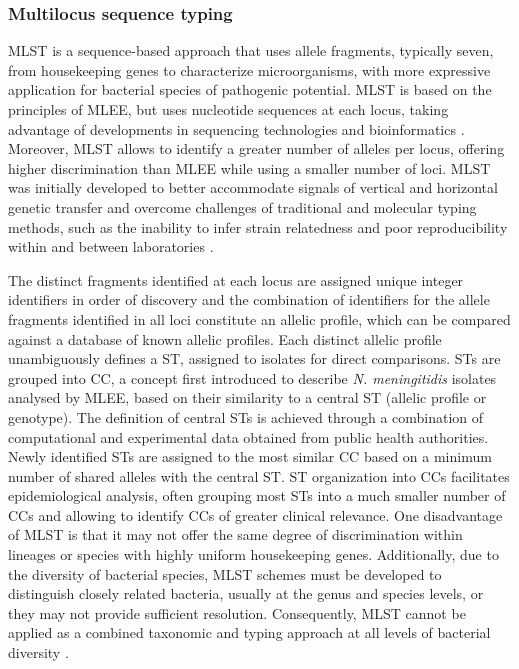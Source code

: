 \subsubsection{Multilocus sequence typing}

\ac{MLST} is a sequence-based approach that uses allele fragments, typically seven, from housekeeping genes to characterize microorganisms, with more expressive application for bacterial species of pathogenic potential. \ac{MLST} is based on the principles of \ac{MLEE}, but uses nucleotide sequences at each locus, taking advantage of developments in sequencing technologies and bioinformatics \cite{urwin_multi-locus_2003}. Moreover, \ac{MLST} allows to identify a greater number of alleles per locus, offering higher discrimination than \ac{MLEE} while using a smaller number of loci. \ac{MLST} was initially developed to better accommodate signals of vertical and horizontal genetic transfer and overcome challenges of traditional and molecular typing methods, such as the inability to infer strain relatedness and poor reproducibility within and between laboratories \cite{maiden_multilocus_1998}.

The distinct fragments identified at each locus are assigned unique integer identifiers in order of discovery and the combination of identifiers for the allele fragments identified in all loci constitute an allelic profile, which can be compared against a database of known allelic profiles. Each distinct allelic profile unambiguously defines a \ac{ST}, assigned to isolates for direct comparisons. \ac{ST}s are grouped into \ac{CC}, a concept first introduced to describe \textit{N. meningitidis} isolates analysed by \ac{MLEE}, based on their similarity to a central \ac{ST} (allelic profile or genotype). The definition of central \ac{ST}s is achieved through a combination of computational and experimental data obtained from public health authorities. Newly identified \ac{ST}s are assigned to the most similar \ac{CC} based on a minimum number of shared alleles with the central \ac{ST}. \ac{ST} organization into \ac{CC}s facilitates epidemiological analysis, often grouping most \ac{ST}s into a much smaller number of \ac{CC}s and allowing to identify \ac{CC}s of greater clinical relevance. One disadvantage of \ac{MLST} is that it may not offer the same degree of discrimination within lineages or species with highly uniform housekeeping genes. Additionally, due to the diversity of bacterial species, \ac{MLST} schemes must be developed to distinguish closely related bacteria, usually at the genus and species levels, or they may not provide sufficient resolution. Consequently, \ac{MLST} cannot be applied as a combined taxonomic and typing approach at all levels of bacterial diversity \cite{jolley_ribosomal_2012}.

